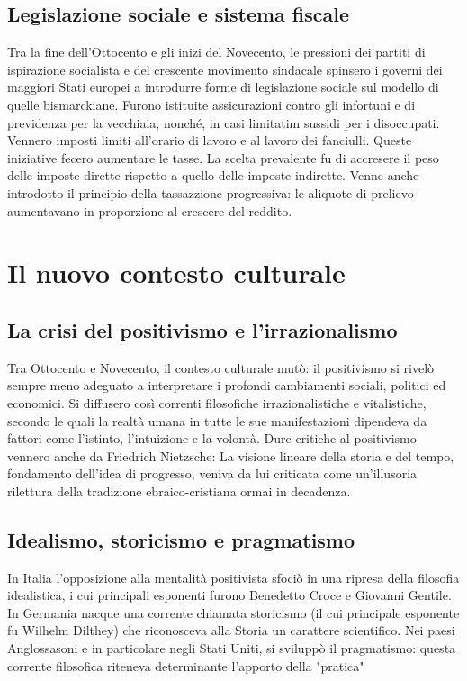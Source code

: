 \documentclass{report}
\begin{document}
\subsection{Legislazione sociale e sistema fiscale}
Tra la fine dell'Ottocento e gli inizi del Novecento, le pressioni dei partiti di ispirazione socialista e del crescente movimento sindacale spinsero i governi dei maggiori Stati europei a introdurre forme di legislazione sociale sul modello di quelle bismarckiane. Furono istituite assicurazioni contro gli infortuni e di previdenza per la vecchiaia, nonché, in casi limitatim sussidi per i disoccupati. Vennero imposti limiti all'orario di lavoro e al lavoro dei fanciulli.
Queste iniziative fecero aumentare le tasse. La scelta prevalente fu di accresere il peso delle imposte dirette rispetto a quello delle imposte indirette. Venne anche introdotto il principio della tassazzione progressiva: le aliquote di prelievo aumentavano in proporzione al crescere del reddito.

\section{Il nuovo contesto culturale}
\subsection{La crisi del positivismo e l'irrazionalismo}
Tra Ottocento e Novecento, il contesto culturale mutò: il positivismo si rivelò sempre meno adeguato a interpretare i profondi cambiamenti sociali, politici ed economici. Si diffusero così correnti filosofiche irrazionalistiche e vitalistiche, secondo le quali la realtà umana in tutte le sue manifestazioni dipendeva da fattori come l'istinto, l'intuizione e la volontà. Dure critiche al positivismo vennero anche da Friedrich Nietzsche: La visione lineare della storia e del tempo, fondamento dell'idea di progresso, veniva da lui criticata come un'illusoria rilettura della tradizione ebraico-cristiana ormai in decadenza.

\subsection{Idealismo, storicismo e pragmatismo}

In Italia l'opposizione alla mentalità positivista sfociò in una ripresa della filosofia idealistica, i cui principali esponenti furono Benedetto Croce e Giovanni Gentile.
In Germania nacque una corrente chiamata storicismo (il cui principale esponente fu Wilhelm Dilthey) che riconosceva alla Storia un carattere scientifico.
Nei paesi Anglossasoni e in particolare negli Stati Uniti, si sviluppò il pragmatismo: questa corrente filosofica riteneva determinante l'apporto della "pratica"
\end{document}
